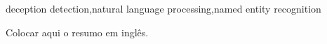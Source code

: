 
\begin{englishabstract}{}{deception detection,natural language processing,named entity recognition}



Colocar aqui o resumo em inglês.
\end{englishabstract}

